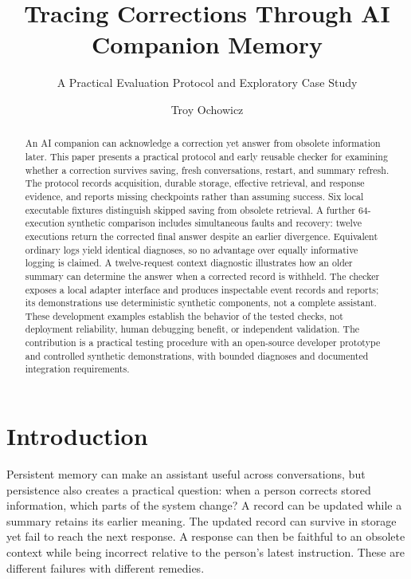 \documentclass[runningheads]{llncs}
\begin{document}
\title{Tracing Corrections Through AI Companion Memory}
\subtitle{A Practical Evaluation Protocol and Exploratory Case Study}
\author{Troy Ochowicz}
\maketitle
\begin{abstract}
An AI companion can acknowledge a correction yet answer from obsolete information later. This paper presents a practical protocol and early reusable checker for examining whether a correction survives saving, fresh conversations, restart, and summary refresh. The protocol records acquisition, durable storage, effective retrieval, and response evidence, and reports missing checkpoints rather than assuming success. Six local executable fixtures distinguish skipped saving from obsolete retrieval. A further 64-execution synthetic comparison includes simultaneous faults and recovery: twelve executions return the corrected final answer despite an earlier divergence. Equivalent ordinary logs yield identical diagnoses, so no advantage over equally informative logging is claimed. A twelve-request context diagnostic illustrates how an older summary can determine the answer when a corrected record is withheld. The checker exposes a local adapter interface and produces inspectable event records and reports; its demonstrations use deterministic synthetic components, not a complete assistant. These development examples establish the behavior of the tested checks, not deployment reliability, human debugging benefit, or independent validation. The contribution is a practical testing procedure with an open-source developer prototype and controlled synthetic demonstrations, with bounded diagnoses and documented integration requirements.
\end{abstract}

\section{Introduction}
Persistent memory can make an assistant useful across conversations, but persistence also creates a practical question: when a person corrects stored information, which parts of the system change? A record can be updated while a summary retains its earlier meaning. The updated record can survive in storage yet fail to reach the next response. A response can then be faithful to an obsolete context while being incorrect relative to the person's latest instruction. These are different failures with different remedies.
\end{document}
